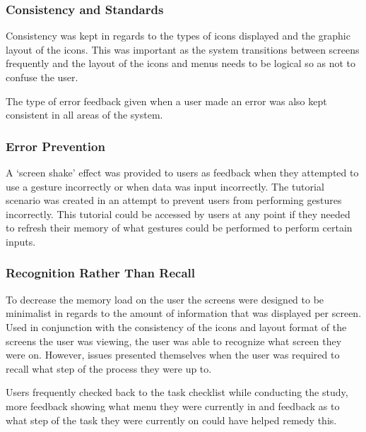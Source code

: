 \documentclass{article}
\begin{document}
            \subsubsection{Consistency and Standards}
                Consistency was kept in regards to the types of icons displayed 
                and the graphic layout of the icons. This was important as the 
                system transitions between screens frequently and the layout of 
                the icons and menus needs to be logical so as not to confuse the user.
                \par
                The type of error feedback given when a user made an error was also kept 
                consistent in all areas of the system.
            
            \subsubsection{Error Prevention}
                A ‘screen shake’ effect was provided to users as feedback when they attempted 
                to use a gesture incorrectly or when data was input incorrectly. The tutorial 
                scenario was created in an attempt to prevent users from performing gestures 
                incorrectly. This tutorial could be accessed by users at any point if they 
                needed to refresh their memory of what gestures could be performed to perform 
                certain inputs.

            \subsubsection{Recognition Rather Than Recall}
                To decrease the memory load on the user the screens were designed to be 
                minimalist in regards to the amount of information that was displayed per 
                screen. Used in conjunction with the consistency of the icons and layout 
                format of the screens the user was viewing, the user was able to recognize 
                what screen they were on. However, issues presented themselves when the user
                was required to recall what step of the process they were up to.
                \par
                Users frequently checked back to the task checklist while conducting the 
                study, more feedback showing what menu they were currently in and feedback 
                as to what step of the task they were currently on could have helped remedy this.
\end{document}
